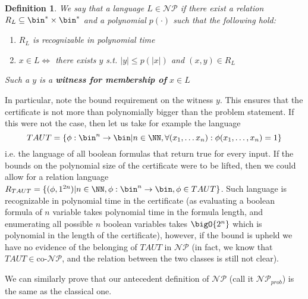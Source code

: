 \documentclass{article}
\newtheorem{definition}{Definition}
\begin{document}
\begin{definition}
We say that a language $L \in \mathcal{NP}$ if there exist a relation $R_L \subseteq \bin^* \times \bin^*$ and a polynomial $p(\cdot)$ such that the following hold: 
\begin{enumerate}
    \item $R_L$ is recognizable in polynomial time
    \item $x \in L \iff$ there exists $y$ s.t. $|y| \leq p(|x|)$ and $(x, y) \in R_L$
\end{enumerate}
Such a $y$ is a \textbf{witness for membership of } $x \in L$
\end{definition}
In particular, note the bound requirement on the witness $y$. This ensures that the certificate is not more than polynomially bigger than the problem statement. If this were not the case, then let us take for example the language \[TAUT = \{ \phi : \bin^n \to \bin | n \in \NN, \forall (x_1, \dots x_n): \phi(x_1, \dots, x_n) = 1\}\]
i.e. the language of all boolean formulas that return true for every input. If the bounds on the polynomial size of the certificate were to be lifted, then we could allow for a relation language $R_{TAUT} = \{ (\phi, 1^{2n}) | n \in \NN, \phi : \bin^n \to \bin, \phi \in TAUT  \}$. Such language is recognizable in polynomial time in the certificate (as evaluating a boolean formula of $n$ variable takes polynomial time in the formula length, and enumerating all possible $n$ boolean variables takes $\bigO{2^n}$ which is polynomial in the length of the certificate), however, if the bound is upheld we have no evidence of the belonging of $TAUT$ in $\mathcal{NP}$ (in fact, we know that $TAUT \in \text{co-}\mathcal{NP}$, and the relation between the two classes is still not clear).

We can similarly prove that our antecedent definition of $\mathcal{NP}$ (call it $\mathcal{NP}_{prob}$) is the same as the classical one. 
\end{document}
